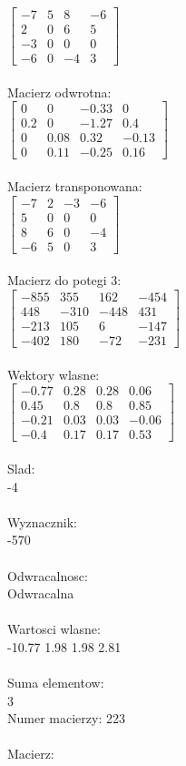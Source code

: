 \documentclass[a4paper,12pt]{article}
\begin{document}
$\begin{bmatrix} -7&5&8&-6\\2&0&6&5\\-3&0&0&0\\-6&0&-4&3 \end{bmatrix}$
\\
\\
Macierz odwrotna:\\

$\begin{bmatrix} 0&0&-0.33&0\\0.2&0&-1.27&0.4\\0&0.08&0.32&-0.13\\0&0.11&-0.25&0.16 \end{bmatrix}$
\\
\\
Macierz transponowana:\\

$\begin{bmatrix} -7&2&-3&-6\\5&0&0&0\\8&6&0&-4\\-6&5&0&3 \end{bmatrix}$
\\
\\
Macierz do potegi 3:\\

$\begin{bmatrix} -855&355&162&-454\\448&-310&-448&431\\-213&105&6&-147\\-402&180&-72&-231 \end{bmatrix}$
\\
\\
Wektory wlasne:\\

$\begin{bmatrix} -0.77&0.28&0.28&0.06\\0.45&0.8&0.8&0.85\\-0.21&0.03&0.03&-0.06\\-0.4&0.17&0.17&0.53 \end{bmatrix}$
\\
\\
Slad:\\
-4
\\
\\
Wyznacznik:\\
-570
\\
\\
Odwracalnosc:\\
Odwracalna
\\
\\
Wartosci wlasne:\\
-10.77 1.98 1.98 2.81
\\
\\
Suma elementow:\\
3
\\
\newpage
Numer macierzy:
223
\\
\\
Macierz:\\
\end{document}
